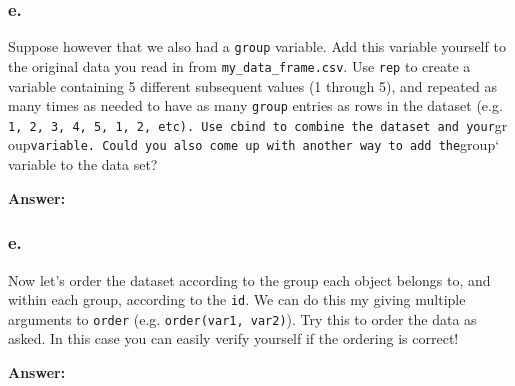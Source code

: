 \documentclass[]{article}
\newenvironment{Shaded}{\begin{snugshade}}{\end{snugshade}}
\newcommand{\CommentTok}[1]{\textcolor[rgb]{0.56,0.35,0.01}{\textit{#1}}}
\newcommand{\DataTypeTok}[1]{\textcolor[rgb]{0.13,0.29,0.53}{#1}}
\newcommand{\DecValTok}[1]{\textcolor[rgb]{0.00,0.00,0.81}{#1}}
\newcommand{\KeywordTok}[1]{\textcolor[rgb]{0.13,0.29,0.53}{\textbf{#1}}}
\newcommand{\NormalTok}[1]{#1}
\newcommand{\OperatorTok}[1]{\textcolor[rgb]{0.81,0.36,0.00}{\textbf{#1}}}
\newcommand{\StringTok}[1]{\textcolor[rgb]{0.31,0.60,0.02}{#1}}
\begin{document}
\hypertarget{e.-4}{%
\subsubsection{e.}\label{e.-4}}

Suppose however that we also had a \texttt{group} variable. Add this
variable yourself to the original data you read in from
\texttt{my\_data\_frame.csv}. Use \texttt{rep} to create a variable
containing 5 different subsequent values (1 through 5), and repeated as
many times as needed to have as many \texttt{group} entries as rows in
the dataset (e.g.
\texttt{1,\ 2,\ 3,\ 4,\ 5,\ 1,\ 2,\ etc).\ Use\ cbind\ to\ combine\ the\ dataset\ and\ your}group\texttt{variable.\ Could\ you\ also\ come\ up\ with\ another\ way\ to\ add\ the}group`
variable to the data set?

\textbf{Answer:}

\begin{Shaded}
\end{Shaded}

\hypertarget{e.-5}{%
\subsubsection{e.}\label{e.-5}}

Now let's order the dataset according to the group each object belongs
to, and within each group, according to the \texttt{id}. We can do this
my giving multiple arguments to \texttt{order} (e.g.
\texttt{order(var1,\ var2)}). Try this to order the data as asked. In
this case you can easily verify yourself if the ordering is correct!

\textbf{Answer:}

\begin{Shaded}
\end{Shaded}
\end{document}
